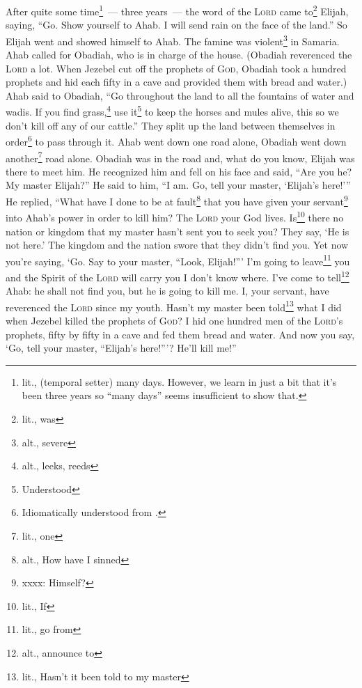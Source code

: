 
\begin{inparaenum}
     After quite some time\footnote{lit., (temporal setter) many days. However, we learn in just a bit that it's been three years so ``many days'' seems insufficient to show that.}~--- three years~--- the word of the \textsc{Lord} came to\footnote{lit., was} Elijah, saying, ``Go. Show yourself to Ahab. I will send rain on the face of the land.''%
     So Elijah went and showed himself to Ahab. The famine was violent\footnote{alt., severe} in Samaria.%
     Ahab called for Obadiah, who is in charge of the house. (Obadiah reverenced the \textsc{Lord} a lot.%
     When Jezebel cut off the prophets of \textsc{God}, Obadiah took a hundred prophets and hid each fifty in a cave and provided them with bread and water.)%
     Ahab said to Obadiah, ``Go throughout the land to all the fountains of water and wadis. If you find grass,\footnote{alt., leeks, reeds} use it\footnote{Understood} to keep the horses and mules alive, this so we don't kill off any of our cattle.''%
     They split up the land between themselves in order\footnote{Idiomatically understood from .} to pass through it. Ahab went down one road alone, Obadiah went down another\footnote{lit., one} road alone.%
     Obadiah was in the road and, what do you know, Elijah was there to meet him. He recognized him and fell on his face and said, ``Are you he? My master Elijah?''%
     He said to him, ``I am. Go, tell your master, `Elijah's here!'\thinspace''%
     He replied, ``What have I done to be at fault\footnote{alt., How have I sinned} that you have given your servant\footnote{xxxx: Himself?} into Ahab's power in order to kill him?%
     The \textsc{Lord} your God lives. Is\footnote{lit., If} there no nation or kingdom that my master hasn't sent you to seek you? They say, `He is not here.' The kingdom and the nation swore that they didn't find you.%
     Yet now you're saying, `Go. Say to your master, ``Look, Elijah!''\thinspace'%
     I'm going to leave\footnote{lit., go from} you and the Spirit of the \textsc{Lord} will carry you I don't know where. I've come to tell\footnote{alt., announce to} Ahab: he shall not find you, but he is going to kill me. I, your servant, have reverenced the \textsc{Lord} since my youth.%
     Hasn't my master been told\footnote{lit., Hasn't it been told to my master} what I did when Jezebel killed the prophets of \textsc{God}? I hid one hundred men of the \textsc{Lord}'s prophets, fifty by fifty in a cave and fed them bread and water.%
     And now you say, `Go, tell your master, ``Elijah's here!''\thinspace'? He'll kill me!''%
    

\end{inparaenum}
